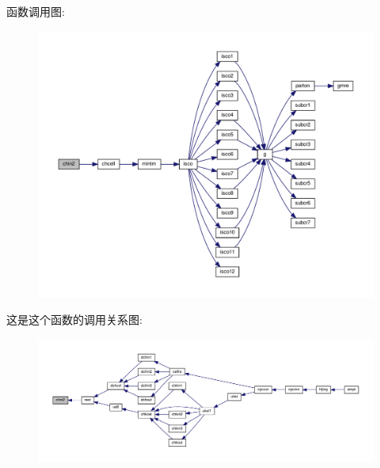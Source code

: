 函数调用图\+:
\nopagebreak
\begin{figure}[H]
\begin{center}
\leavevmode
\includegraphics[width=350pt]{chin2_8f90_a5e5eadb43f002556a151d1c70dd43ca9_cgraph}
\end{center}
\end{figure}
这是这个函数的调用关系图\+:
\nopagebreak
\begin{figure}[H]
\begin{center}
\leavevmode
\includegraphics[width=350pt]{chin2_8f90_a5e5eadb43f002556a151d1c70dd43ca9_icgraph}
\end{center}
\end{figure}
